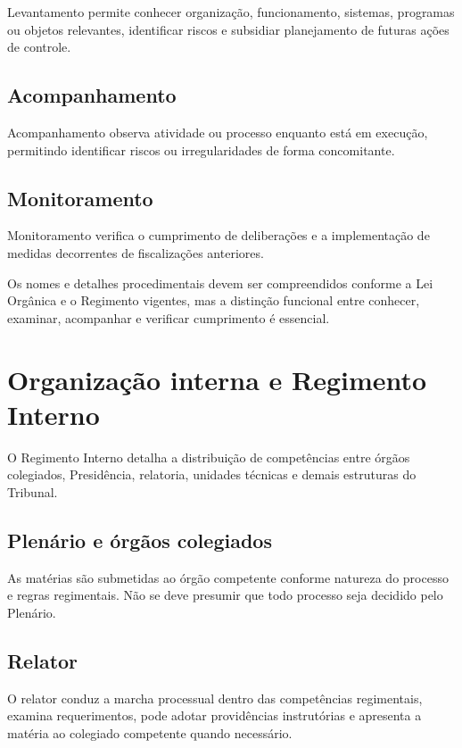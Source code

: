 Levantamento permite conhecer organização, funcionamento, sistemas, programas ou objetos relevantes, identificar riscos e subsidiar planejamento de futuras ações de controle.

\subsection{Acompanhamento}

Acompanhamento observa atividade ou processo enquanto está em execução, permitindo identificar riscos ou irregularidades de forma concomitante.

\subsection{Monitoramento}

Monitoramento verifica o cumprimento de deliberações e a implementação de medidas decorrentes de fiscalizações anteriores.

Os nomes e detalhes procedimentais devem ser compreendidos conforme a Lei Orgânica e o Regimento vigentes, mas a distinção funcional entre conhecer, examinar, acompanhar e verificar cumprimento é essencial.

\section{Organização interna e Regimento Interno}

O Regimento Interno detalha a distribuição de competências entre órgãos colegiados, Presidência, relatoria, unidades técnicas e demais estruturas do Tribunal.

\subsection{Plenário e órgãos colegiados}

As matérias são submetidas ao órgão competente conforme natureza do processo e regras regimentais. Não se deve presumir que todo processo seja decidido pelo Plenário.

\subsection{Relator}

O relator conduz a marcha processual dentro das competências regimentais, examina requerimentos, pode adotar providências instrutórias e apresenta a matéria ao colegiado competente quando necessário.

